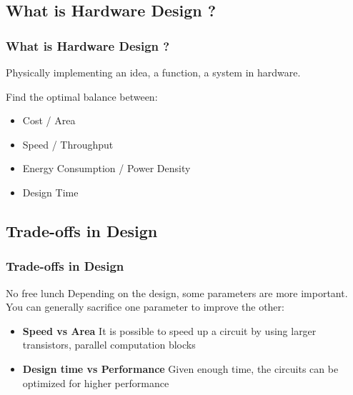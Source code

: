 \documentclass[compress]{beamer}
\begin{document}
\subsection[What]{What is Hardware Design ?}
\begin{frame}
	\frametitle{What is Hardware Design ?}
		Physically implementing an idea, a function, a system in hardware.
		\pause%
		\begin{block}{Find the optimal balance between:}
			\begin{itemize}
				\item Cost / Area
				\item Speed / Throughput
				\item Energy Consumption / Power Density
				\item Design Time
			\end{itemize}
		\end{block}
\end{frame}

\subsection[Tradeoffs]{Trade-offs in Design}
\begin{frame}
	\frametitle{Trade-offs in Design}
	\begin{block}{No free lunch}
	Depending on the design, some parameters are more important.
	You can generally sacrifice one parameter to improve the other:
	\pause%
	\begin{itemize}
		\item \textbf{Speed vs Area} \newline
			It is possible to speed up a circuit by using larger transistors,
			parallel computation blocks
			\pause
		\item \textbf{Design time vs Performance}
		\newline
		Given enough time, the circuits can be optimized for higher
		performance
	\end{itemize}
	\end{block}	
\end{frame}
\end{document}
